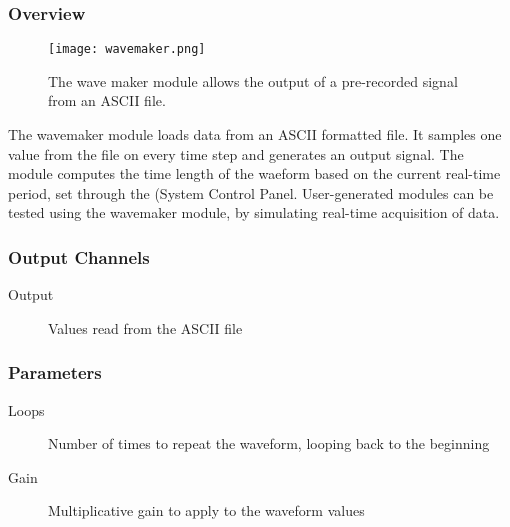 
\subsubsection{Overview}
\label{Wave Maker}

\begin{figure}[h]
\begin{center}
\texttt{[image: wavemaker.png]} 
\caption[Wave Maker]{The wave maker module allows the output of a pre-recorded signal from an ASCII file.} 
\end{center}
\label{wavemaker}
\end{figure}

The wavemaker module loads data from an ASCII formatted file. It samples one value from the file on every time step and generates an output signal. The module computes the time length of the waeform based on the current real-time period, set through the (System Control Panel. User-generated modules can be tested using the wavemaker module, by simulating real-time acquisition of data.

\subsubsection{Output Channels}
\begin{description}
\item [Output]Values read from the ASCII file
\end{description}

\subsubsection{Parameters}
\begin{description}
\item [Loops]Number of times to repeat the waveform, looping back to the beginning
\item [Gain]Multiplicative gain to apply to the waveform values
\end{description}